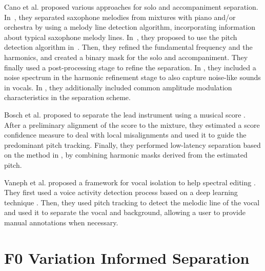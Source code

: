 Cano et al. proposed various approaches for solo and accompaniment separation. In~\cite{cano09}, they separated saxophone melodies from mixtures with piano and/or orchestra by using a melody line detection algorithm, incorporating information about typical saxophone melody lines. In~\cite{grollmisch11,dittmar12,cano12}, they proposed to use the pitch detection algorithm in~\cite{dressler11}. Then, they refined the fundamental frequency and the harmonics, and created a binary mask for the solo and accompaniment. They finally used a post-processing stage to refine the separation. In \cite{cano13}, they included a noise spectrum in the harmonic refinement stage to also capture noise-like sounds in vocals. In \cite{cano14}, they additionally included common amplitude modulation characteristics in the separation scheme.
\par
Bosch et al. proposed to separate the lead instrument using a musical score \cite{bosch12}. After a preliminary alignment of the score to the mixture, they estimated a score confidence measure to deal with local misalignments and used it to guide the predominant pitch tracking. Finally, they performed low-latency separation based on the method in \cite{marxer12}, by combining harmonic masks derived from the estimated pitch.
\par
Vaneph et al. proposed a framework for vocal isolation to help spectral editing \cite{vaneph16}. They first used a voice activity detection process based on a deep learning technique \cite{Leglaive15}. Then, they used pitch tracking to detect the melodic line of the vocal and used it to separate the vocal and background, allowing a user to provide manual annotations when necessary.

\section{F0 Variation Informed Separation}
\label{sub:frequency_modulation}


